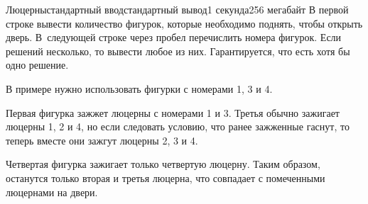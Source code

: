 \begin{problem}{Люцерны}{стандартный ввод}{стандартный вывод}{1 секунда}{256 мегабайт}
\OutputFile
В первой строке вывести количество фигурок, которые необходимо поднять, чтобы открыть дверь. В~следующей строке через пробел перечислить номера фигурок. Если решений несколько, то вывести любое из них. Гарантируется, что есть хотя бы одно решение.

\Example

\begin{example}
%
\end{example}

\Note
В примере нужно использовать фигурки с номерами 1, 3 и 4. 

Первая фигурка зажжет люцерны с номерами 1 и 3. Третья обычно зажигает люцерны 1, 2 и 4, но если следовать условию, что ранее зажженные гаснут, то теперь вместе они зажгут люцерны 2, 3 и 4.

Четвертая фигурка зажигает только четвертую люцерну. Таким образом, останутся только вторая и третья люцерна, что совпадает с помеченными люцернами на двери.

\end{problem}

